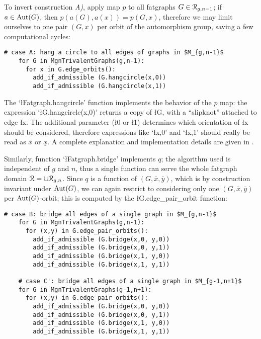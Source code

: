 To invert construction {\sl A)}, apply map $p$ to all fatgraphs $G \in
\mathcal{R}_{g,n-1}$; if $a \in \operatorname{Aut}(G)$, then $p(a(G), a(x)) = p(G, x)$,
therefore we may limit ourselves to one pair $(G,x)$ per orbit of the
automorphism group, saving a few computational cycles:
\begin{lstlisting}[name=MgnTrivalentGraphs,firstnumber=30]
    # case A: hang a circle to all edges of graphs in $M_{g,n-1}$
    for G in MgnTrivalentGraphs(g,n-1):
      for x in G.edge_orbits():
        add_if_admissible (G.hangcircle(x,0))
        add_if_admissible (G.hangcircle(x,1))

\end{lstlisting}
The `\l{Fatgraph.hangcircle}' function implements the behavior of the
$p$ map: the expression `\l{G.hangcircle(x,0)}' returns a copy of
\l{G}, with a ``slipknot'' attached to edge \l{x}.  The additional
parameter (\l{0} or \l{1}) determines which orientation of \l{x}
should be considered, therefore expressions like `\l{x,0}' and
`\l{x,1}' should really be read as $\bar{x}$ or $\underline{x}$. A
complete explanation and implementation details are given in
.

Similarly, function `\l{Fatgraph.bridge}' implements $q$;
the algorithm used is independent of $g$ and $n$, thus a single
function can serve the whole fatgraph domain $\mathcal{R} = \cup
\mathcal{R}_{g,n}$. Since $q$ is a function of $(G, \bar{x}, \bar{y})$, which
is by construction invariant under $\operatorname{Aut}(G)$, we can again restrict
to considering only one $(G, \bar{x}, \bar{y})$ per $\operatorname{Aut}(G)$-orbit;
this is computed by the \l{G.edge_pair_orbit} function:
\begin{lstlisting}[name=MgnTrivalentGraphs,firstnumber=35]
    # case B: bridge all edges of a single graph in $M_{g,n-1}$
    for G in MgnTrivalentGraphs(g,n-1):
      for (x,y) in G.edge_pair_orbits():
        add_if_admissible (G.bridge(x,0, y,0))
        add_if_admissible (G.bridge(x,0, y,1))
        add_if_admissible (G.bridge(x,1, y,0))
        add_if_admissible (G.bridge(x,1, y,1))

    # case C': bridge all edges of a single graph in $M_{g-1,n+1}$
    for G in MgnTrivalentGraphs(g-1,n+1):
      for (x,y) in G.edge_pair_orbits():
        add_if_admissible (G.bridge(x,0, y,0))
        add_if_admissible (G.bridge(x,0, y,1))
        add_if_admissible (G.bridge(x,1, y,0))
        add_if_admissible (G.bridge(x,1, y,1))

\end{lstlisting}

